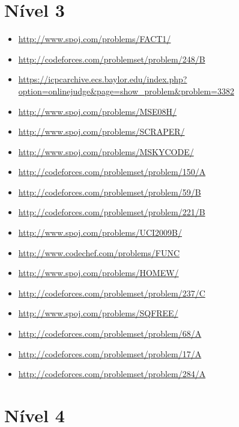 \section{Nível 3}

\begin{itemize}
\item \url{http://www.spoj.com/problems/FACT1/}
\item \url{http://codeforces.com/problemset/problem/248/B}
\item \url{https://icpcarchive.ecs.baylor.edu/index.php?option=onlinejudge&page=show_problem&problem=3382}
\item \url{http://www.spoj.com/problems/MSE08H/}
\item \url{http://www.spoj.com/problems/SCRAPER/}
\item \url{http://www.spoj.com/problems/MSKYCODE/}
\item \url{http://codeforces.com/problemset/problem/150/A}
\item \url{http://codeforces.com/problemset/problem/59/B}
\item \url{http://codeforces.com/problemset/problem/221/B}
\item \url{http://www.spoj.com/problems/UCI2009B/}
\item \url{http://www.codechef.com/problems/FUNC}
\item \url{http://www.spoj.com/problems/HOMEW/}
\item \url{http://codeforces.com/problemset/problem/237/C}
\item \url{http://www.spoj.com/problems/SQFREE/}
\item \url{http://codeforces.com/problemset/problem/68/A}
\item \url{http://codeforces.com/problemset/problem/17/A}
\item \url{http://codeforces.com/problemset/problem/284/A}
\end{itemize}



\section{Nível 4}

